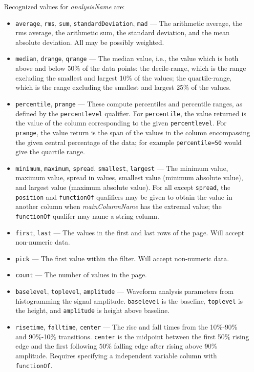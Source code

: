 \begin{itemize}
\begin{itemize}
\begin{itemize}
Recognized values for {\em analysisName} are:

\begin{itemize}
\item {\tt average}, {\tt rms}, {\tt sum}, {\tt standardDeviation}, {\tt mad} --- The arithmetic average, 
the rms average, the arithmetic sum, the standard deviation, and the mean absolute deviation.  All may be possibly
weighted.
\item {\tt median}, {\tt drange}, {\tt qrange} --- The median value, i.e., the value which is both above and below
50\% of the data points; the decile-range, which is the range excluding the smallest and largest 10\% of the values;
the quartile-range, which is the range excluding the smallest and largest 25\% of the values.
\item {\tt percentile}, {\tt prange} --- These compute percentiles and percentile ranges, as defined by the 
  {\tt percentlevel} qualifier.  For {\tt percentile}, the value returned is the value of the column corresponding
  to the given {\tt percentlevel}.  For {\tt prange}, the value return is the span of the values in the column
  encompassing the given central percentage of the data; for example {\tt percentile=50} would give the quartile range.

\item {\tt minimum}, {\tt maximum}, {\tt spread}, {\tt smallest}, {\tt largest} --- 
The minimum value, maximum value, spread in values, smallest value (minimum absolute value), and largest value
(maximum absolute value).  For all except {\tt spread}, the {\tt position} and {\tt functionOf} qualifiers may be
given to obtain the value in another column when {\em mainColumnName} has the extremal value; the {\tt functionOf} qualifer may name a string column.

\item {\tt first}, {\tt last} --- The values in the first and last rows of the page.  Will accept non-numeric
data.
\item {\tt pick} --- The first value within the filter.  Will accept non-numeric data.
\item {\tt count} ---  The number of values in the page.
\item {\tt baselevel}, {\tt toplevel}, {\tt amplitude} --- Waveform analysis parameters from histogramming
the signal amplitude.  {\tt baselevel} is the baseline, {\tt toplevel} is the height, and {\tt amplitude}
is height above baseline.

\item {\tt risetime}, {\tt falltime}, {\tt center} --- The rise and fall times from the 10\%-90\% and
90\%-10\% transitions.  {\tt center} is the midpoint between the first 50\% rising edge and the first following 50\%
falling edge after rising above 90\% amplitude.  Requires specifying a independent variable column with {\tt
functionOf}.


\end{itemize}
\end{itemize}
\end{itemize}
\end{itemize}
